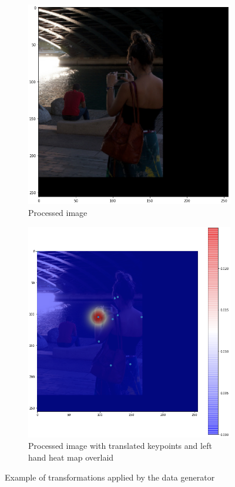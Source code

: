 \documentclass[11pt, letterpaper]{article}
\begin{document}
\begin{figure}[h]
\begin{subfigure}{0.4\linewidth}
        \includegraphics[width=\textwidth]{processed_image.png}
        \caption{Processed image}
    \end{subfigure}
    \begin{subfigure}{0.4\linewidth}
        \includegraphics[width=\textwidth]{processed_image_w_anns.png}
        \caption{Processed image with translated keypoints and left hand heat map overlaid}
    \end{subfigure}
    \caption{Example of transformations applied by the data generator}
    \label{fig:data_gen_ex}
\end{figure}
\end{document}
